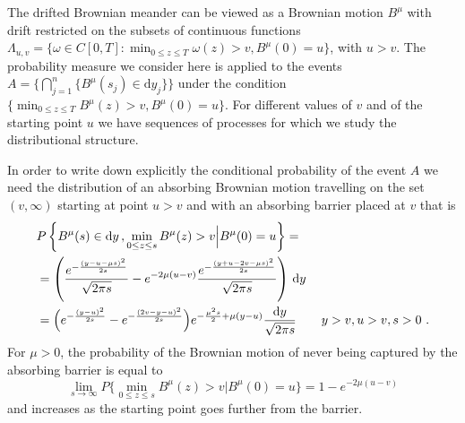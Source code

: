 The drifted Brownian meander can be viewed as a Brownian motion $ B^\mu $
with drift restricted on the subsets of continuous functions 
$ \Lambda_{u,v} = \{  \omega \in C[0,T]:  \min_{ 0\leq z \leq T} \omega(z) > v, B^\mu(0) = u \} $, with $ u>v $.
The probability measure we consider here is applied to the events 
$ A = \big \{ \bigcap_{j=1}^n \{ B^{\mu} (s_j) \in \mathrm d y_j \} \big \} $ under the 
condition $ \{ \min_{ 0\leq z \leq T} B^\mu (z) > v, B^\mu(0)=u \} $. 
%
%
For different values of $ v $ and of the starting point $ u $ we have sequences of 
processes for which we study the distributional structure. 

In order to write down explicitly  the conditional  probability of the event $ A $ we
need the distribution of an absorbing Brownian motion travelling on the set 
$ (v, \infty) $ starting at point $ u>v $ and with an absorbing 
barrier placed at $ v $ that is
%
\begin{align}\label{eq:bm-drift-recall-new}
&P\left\{  B^\mu(s) \in \mathrm d y\, ,  \min_{0\leq z \leq s} B^\mu(z)> v \Big \vert   B^\mu(0) = u\right \} 
=\\
&=\left( 
\frac{
	e^{- \frac{ (y- u - \mu s)^2}{2 s } } 
}{ %
	\sqrt{2\pi s }} - 
e^{ - 2 \mu (u - v) } 
\frac{
	e^{- \frac{ (y + u - 2v - \mu s)^2}{2 s } } 
}{ %
	\sqrt{2\pi s } }\right)	\, \mathrm d y \notag \\
&=
\Big( 
	e^{- \frac{ (y- u )^2}{2 s } } -
	e^{- \frac{ (2v - y - u)^2}{2 s } }
\Big)
	e^{ - \frac{\mu^2 s}{2} + \mu ( y-u) }
  \frac{ \mathrm d y}{\sqrt{2 \pi s }} \qquad y>v, u>v, s>0 \,\, .\notag 
\end{align} 
%
%
For $ \mu >0 $, the probability of the Brownian motion of never being captured 
by the absorbing barrier is equal to
%
%
\[ \lim_{s \to \infty } 
	P\Big\{ \min_{0\leq z \leq s} B^\mu(z)> v 
	\Big \vert   B^\mu(0) = u \big\} = 
	1 - e^{-2 \mu (u-v)} 	
 \]
and increases as the starting point goes further from the barrier. 
%
%
%
